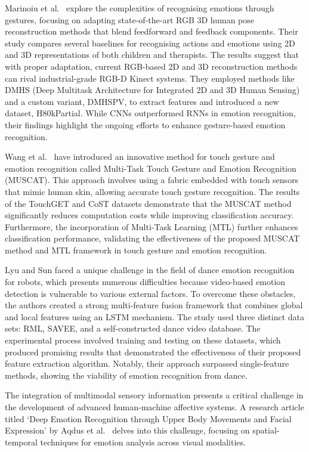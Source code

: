 Marinoiu et al.\ \cite{8578328} explore the complexities of recognising emotions through gestures, focusing on adapting state-of-the-art RGB 3D human pose reconstruction methods that blend feedforward and feedback components. Their study compares several baselines for recognising actions and emotions using 2D and 3D representations of both children and therapists. The results suggest that with proper adaptation, current RGB-based 2D and 3D reconstruction methods can rival industrial-grade RGB-D Kinect systems. They employed methods like DMHS (Deep Multitask Architecture for Integrated 2D and 3D Human Sensing) and a custom variant, DMHSPV, to extract features and introduced a new dataset, H80kPartial. While CNNs outperformed RNNs in emotion recognition, their findings highlight the ongoing efforts to enhance gesture-based emotion recognition.

Wang et al.\ \cite{Wang2022-eq} have introduced an innovative method for touch gesture and emotion recognition called Multi-Task Touch Gesture and Emotion Recognition (MUSCAT). This approach involves using a fabric embedded with touch sensors that mimic human skin, allowing accurate touch gesture recognition. The results of the TouchGET and CoST datasets demonstrate that the MUSCAT method significantly reduces computation costs while improving classification accuracy. Furthermore, the incorporation of Multi-Task Learning (MTL) further enhances classification performance, validating the effectiveness of the proposed MUSCAT method and MTL framework in touch gesture and emotion recognition.

Lyu and Sun \cite{Lyu2022-vd} faced a unique challenge in the field of dance emotion recognition for robots, which presents numerous difficulties because video-based emotion detection is vulnerable to various external factors. To overcome these obstacles, the authors created a strong multi-feature fusion framework that combines global and local features using an LSTM mechanism. The study used three distinct data sets: RML, SAVEE, and a self-constructed dance video database. The experimental process involved training and testing on these datasets, which produced promising results that demonstrated the effectiveness of their proposed feature extraction algorithm. Notably, their approach surpassed single-feature methods, showing the viability of emotion recognition from dance.

The integration of multimodal sensory information presents a critical challenge in the development of advanced human-machine affective systems. A research article titled `Deep Emotion Recognition through Upper Body Movements and Facial Expression' by Aqdus et al.\ \cite{Aqdus2021-xr} delves into this challenge, focusing on spatial-temporal techniques for emotion analysis across visual modalities.

